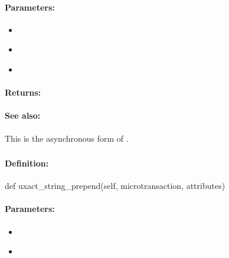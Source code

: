 \paragraph{Parameters:}
\begin{itemize}[noitemsep]
\item {}\\

\item {}\\

\item {}\\

\end{itemize}

\paragraph{Returns:}


\paragraph{See also:}  This is the asynchronous form of .

\pagebreak
\subsubsection{}
\label{api:python:uxact_string_prepend}


\paragraph{Definition:}
\begin{pythoncode}
def uxact_string_prepend(self, microtransaction, attributes)
\end{pythoncode}

\paragraph{Parameters:}
\begin{itemize}[noitemsep]
\item {}\\

\item {}\\

\end{itemize}

